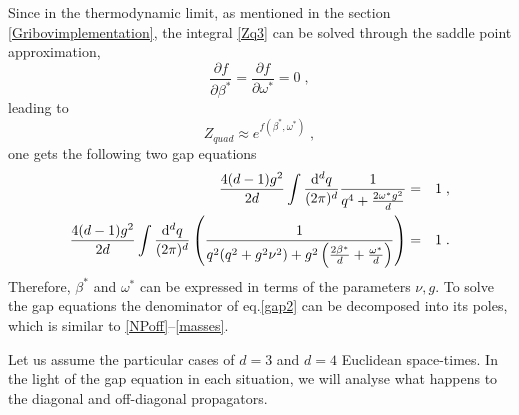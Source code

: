 Since in the thermodynamic limit, as mentioned in the section \ref{Gribovimplementation}, the
integral \eqref{Zq3} can be solved through the saddle point approximation,
\begin{equation}
\frac{\partial f}{\partial \beta^*}=\frac{\partial f}{\partial \omega^*}=0 \;,
\end{equation}
 leading to
\cite{Gribov:1977wm,Sobreiro:2005ec,Vandersickel:2012tz}
\begin{equation}
Z_{quad}\approx e^{f(\beta^*,\omega^*)} \;,
\end{equation}
one gets the following two gap equations
\begin{eqnarray}
\frac{4(d-1)g^{2}}{2d} \int \frac{\mathrm{d}^{d}q}{(2\pi )^{d}} \frac{1}{q^{4}+\frac{2\omega^{\ast}g^{2}}{d}}  &=&1 \;, 
\label{gap1} \\
\frac{4(d-1)g^{2}}{2d}  \int \frac{\mathrm{d}^{d}q}{(2\pi )^{d}}\left( \frac{1}{q^{2}(q^{2}+g^{2}\nu^{2})+g^{2}\left( \frac{2\beta ^{\ast}}{d}+\frac{\omega^{\ast}}{d}\right) }\right) &=&1 \;.
\label{gap2}
\end{eqnarray}
Therefore, $\beta^*$ and $\omega^*$ can be expressed in terms of the parameters $\nu,g$. To solve the gap equations the denominator of eq.\eqref{gap2} can be decomposed into its poles, which is similar to \eqref{NPoff}--\eqref{masses}.

Let us assume the particular cases of $d=3$ and $d=4$ Euclidean space-times. In the light of
the gap equation in each situation, we will analyse what happens to the diagonal and
off-diagonal propagators.









